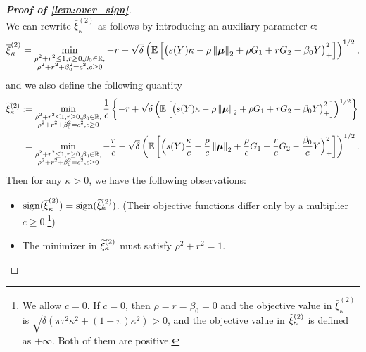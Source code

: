 \begin{proof}[\textbf{Proof of \cref{lem:over_sign}}]
~\\
\noindent
We can rewrite $\bar\xi_{\kappa}^{(2)}$ as follows by introducing an auxiliary parameter $c$:
\begin{equation*}
    \overline\xi_{\kappa}^{(2)} =  \min_{ \substack{ \rho^2 + r^2 \le 1, r \ge 0, \beta_0 \in  \mathbb{R}, \\
    \rho^2 + r^2 + \beta_0^2 = c^2, c \ge 0
} }
-r + \sqrt{\delta} \left( \mathbb{E}\left[ \bigl(  s(Y) \kappa - \rho \left\|{\text{\boldmath $\mu$}}\right\|_2 + \rho G_1 + rG_2 - \beta_0 Y \bigr)_+^2 \right] \right)^{1/2},
\end{equation*}
and we also define the following quantity
\begin{equation*}
    \begin{aligned}
        \widetilde\xi_{\kappa}^{(2)} & :=  \min_{ \substack{ \rho^2 + r^2 \le 1, r \ge 0, \beta_0 \in  \mathbb{R}, \\
        \rho^2 + r^2 + \beta_0^2 = c^2, c \ge 0
    } }
        \frac1c \left\{  -r + \sqrt{\delta} \left( \mathbb{E}\left[ \bigl(  s(Y) \kappa - \rho \left\|{\text{\boldmath $\mu$}}\right\|_2 + \rho G_1 + rG_2 - \beta_0 Y \bigr)_+^2 \right] \right)^{1/2} 
        \right\} \\
        & \phantom{:}=  \min_{ \substack{ \rho^2 + r^2 \le 1, r \ge 0, \beta_0 \in  \mathbb{R}, \\
        \rho^2 + r^2 + \beta_0^2 = c^2, c \ge 0
    } }
        -\frac{r}{c} + \sqrt{\delta} \left( \mathbb{E}\left[ \Bigl( s(Y) \frac{\kappa}{c} - \frac{\rho}{c} \left\|{\text{\boldmath $\mu$}}\right\|_2 + \frac{\rho}{c} G_1 + \frac{r}{c} G_2 - \frac{\beta_0}{c} Y \Bigr)_+^2 \right] \right)^{1/2}.
    \end{aligned}
\end{equation*}
Then for any $\kappa > 0$, we have the following observations:
\begin{itemize}
    \item $\mathrm{sign}(\overline\xi_{\kappa}^{(2)}) = \mathrm{sign}(\widetilde\xi_{\kappa}^{(2)})$. (Their objective functions differ only by a multiplier $c \ge 0$.\footnote{We allow $c = 0$. If $c = 0$, then $\rho = r = \beta_0 = 0$ and the objective value in $\bar\xi_{\kappa}^{(2)}$ is $\sqrt{ \delta(\pi\tau^2\kappa^2 + (1 - \pi)\kappa^2) } > 0$, and the objective value in $\widetilde\xi_{\kappa}^{(2)}$ is defined as $+\infty$. Both of them are positive.
    })
    \item The minimizer in $\widetilde\xi_{\kappa}^{(2)}$ must satisfy $\rho^2 + r^2 = 1$. 
    

\end{itemize}
\end{proof}
